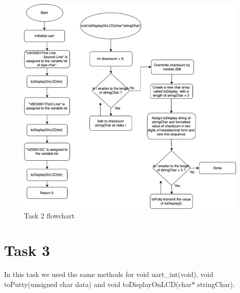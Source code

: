 \documentclass[a4paper,12pt]{article}
\begin{document}
\break
\begin{figure}
\begin{center}
\includegraphics[width=\textwidth/1]{flowchart/task2_flowchart.png}
\end{center}
\caption{Task 2 flowchart}
\label{task2}
\end{figure}

\break


\section{Task 3}
In this task we used the same methods for void uart\_int(void), void toPutty(unsigned char data) and void toDisplayOnLCD(char* stringChar). 
\lstset{style=CStyle}
\end{document}
